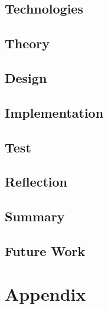 




 
\tableofcontents








\chapter{Technologies}



\chapter{Theory}

\chapter{Design}

\chapter{Implementation}

\chapter{Test}



\chapter{Reflection}


\chapter{Summary}


\chapter{Future Work}


\printbibliography

\part{Appendix}
\appendix


 
